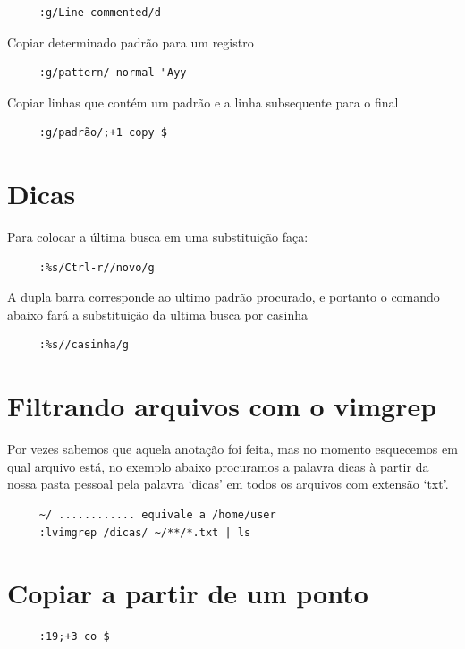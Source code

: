 \documentclass[10pt,a4paper,openany]{book}
\begin{document}
\begin{verbatim}
     :g/Line commented/d
\end{verbatim}

Copiar determinado padrão para um registro

\begin{verbatim}
     :g/pattern/ normal "Ayy
\end{verbatim}

Copiar linhas que contém um padrão e a linha subsequente para o final

\begin{verbatim}
     :g/padrão/;+1 copy $
\end{verbatim}

\section{Dicas }
Para colocar a última busca em uma substituição faça:

\begin{verbatim}
     :%s/Ctrl-r//novo/g
\end{verbatim}

A dupla barra corresponde ao ultimo padrão procurado, e portanto o
comando abaixo fará a substituição da ultima busca por casinha

\begin{verbatim}
     :%s//casinha/g
\end{verbatim}

\section{Filtrando arquivos com o vimgrep}
\label{Filtrando arquivos com o vimgrep}

Por vezes sabemos que aquela anotação foi feita, mas no momento esquecemos em qual
arquivo está, no exemplo abaixo procuramos a palavra dicas à partir da nossa pasta pessoal
pela palavra `dicas' em todos os arquivos com extensão `txt'.

\begin{verbatim}
     ~/ ............ equivale a /home/user
     :lvimgrep /dicas/ ~/**/*.txt | ls
\end{verbatim}


\section{Copiar a partir de um ponto}

\begin{verbatim}
     :19;+3 co $
\end{verbatim}
\end{document}
